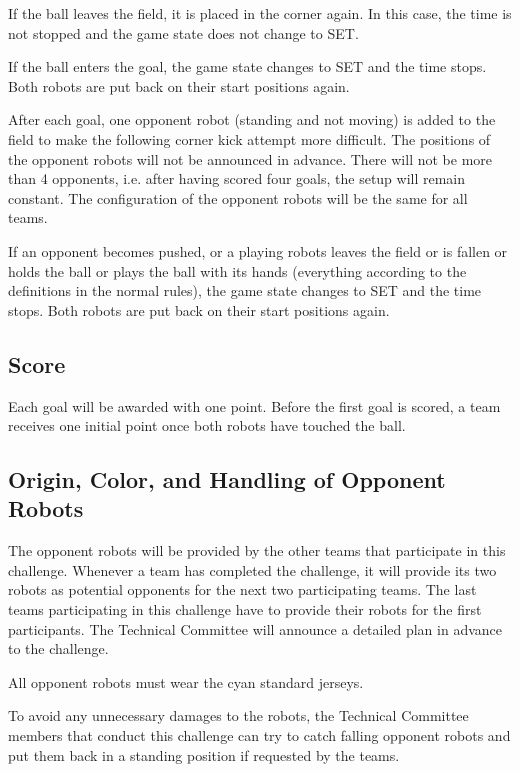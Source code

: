 \documentclass[12pt]{article}
\begin{document}
If the ball leaves the field, it is placed in the corner again. In this case, the time is not stopped and the game state does not change to SET. 

If the ball enters the goal, the game state changes to SET and the time stops. Both robots are put back on their start positions again.

After each goal, one opponent robot (standing and not moving) is added to the field to make the following corner kick attempt more difficult. The positions of the opponent robots will not be announced in advance. There will not be more than 4 opponents, i.e. after having scored four goals, the setup will remain constant. The configuration of the opponent robots will be the same for all teams. 

If an opponent becomes pushed, or a playing robots leaves the field or is fallen or holds the ball or plays the ball with its hands (everything according to the definitions in the normal rules), the game state changes to SET and the time stops. Both robots are put back on their start positions again.

\subsection{Score}
Each goal will be awarded with one point.
Before the first goal is scored, a team receives one initial point once both robots have touched the ball.

\subsection{Origin, Color, and Handling of Opponent Robots}
The opponent robots will be provided by the other teams that participate in this challenge. Whenever a team has completed the challenge, it will provide its two robots as potential opponents for the next two participating teams. The last teams participating in this challenge have to provide their robots for the first participants. The Technical Committee will announce a detailed plan in advance to the challenge.

All opponent robots must wear the cyan standard jerseys.

To avoid any unnecessary damages to the robots, the Technical Committee members that conduct this challenge can try to catch falling opponent robots and put them back in a standing position if requested by the teams.

\newpage
\end{document}

